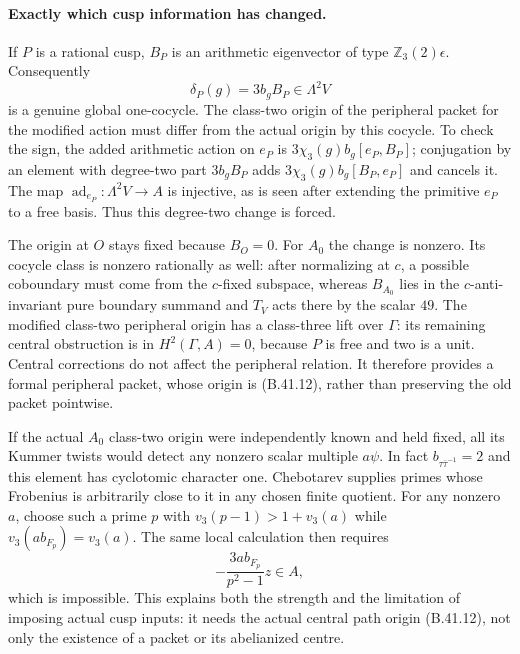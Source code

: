 \paragraph{Exactly which cusp information has changed.}
If $P$ is a rational cusp, $B_P$ is an arithmetic eigenvector
of type $\mathbb Z_3(2)\epsilon$.  Consequently
\[
 \delta_P(g)=3b_gB_P\in\Lambda^2V                         \tag{B.41.12}
\]
is a genuine global one-cocycle.  The class-two origin of
the peripheral packet for the modified action must differ
from the actual origin by this cocycle.  To check the sign,
the added arithmetic action on $e_P$ is
$3\chi_3(g)b_g[e_P,B_P]$; conjugation by an element with
degree-two part $3b_gB_P$ adds
$3\chi_3(g)b_g[B_P,e_P]$ and cancels it.
The map $\operatorname{ad}_{e_P}:\Lambda^2V\to A$ is
injective, as is seen after extending the primitive
$e_P$ to a free basis.  Thus this degree-two change is forced.

The origin at $O$ stays fixed because $B_O=0$.  For $A_0$
the change is nonzero.  Its cocycle class is nonzero
rationally as well: after normalizing at $c$, a possible
coboundary must come from the $c$-fixed subspace, whereas
$B_{A_0}$ lies in the $c$-anti-invariant pure boundary
summand and $T_V$ acts there by the scalar $49$.
The modified class-two peripheral origin has a class-three
lift over $\Gamma$: its remaining central obstruction is
in $H^2(\Gamma,A)=0$, because $P$ is free and two is a unit.
Central corrections do not affect the peripheral relation.
It therefore provides a formal peripheral packet, whose
origin is (B.41.12), rather than preserving the old packet
pointwise.

If the actual $A_0$ class-two origin were independently
known and held fixed, all its Kummer twists would detect
any nonzero scalar multiple $a\psi$.  In fact
$b_{\tau\bar\tau^{-1}}=2$ and this element has cyclotomic
character one.  Chebotarev supplies primes whose Frobenius
is arbitrarily close to it in any chosen finite quotient.
For any nonzero $a$, choose such a prime $p$ with
$v_3(p-1)>1+v_3(a)$ while
$v_3(ab_{F_p})=v_3(a)$.  The same local calculation then
requires
\[
 -\frac{3ab_{F_p}}{p^2-1}z\in A,
\]
which is impossible.  This explains both the strength and
the limitation of imposing actual cusp inputs: it needs
the actual central path origin (B.41.12), not only the
existence of a packet or its abelianized centre.


